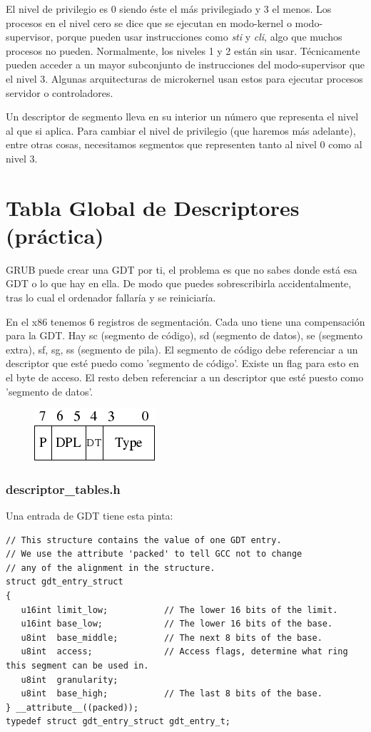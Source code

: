 \documentclass{report}
\begin{document}
El nivel de privilegio es 0 siendo éste el más privilegiado y 3 el menos. Los procesos en el nivel cero se dice que se ejecutan en modo-kernel o modo-supervisor, porque pueden usar instrucciones como \textit{sti} y \textit{cli}, algo que muchos procesos no pueden. Normalmente, los niveles 1 y 2 están sin usar. Técnicamente pueden acceder a un mayor subconjunto de instrucciones del modo-supervisor que el nivel 3. Algunas arquitecturas de microkernel usan estos para ejecutar procesos servidor o controladores.

Un descriptor de segmento lleva en su interior un número que representa el nivel al que si aplica. Para cambiar el nivel de privilegio (que haremos más adelante), entre otras cosas, necesitamos segmentos que representen tanto al nivel 0 como al nivel 3.

\section{Tabla Global de Descriptores (práctica)}

GRUB puede crear una GDT por ti, el problema es que no sabes donde está esa GDT o lo que hay en ella. De modo que puedes sobrescribirla accidentalmente, tras lo cual el ordenador fallaría y se reiniciaría.

En el x86 tenemos 6 registros de segmentación. Cada uno tiene una compensación para la GDT. Hay sc (segmento de código), sd (segmento de datos), se (segmento extra), sf, sg, ss (segmento de pila). El segmento de código debe referenciar a un descriptor que esté puedo como 'segmento de código'. Existe un flag para esto en el byte de acceso. El resto deben referenciar a un descriptor que esté puesto como 'segmento de datos'.

\begin{figure}[htb]
\centering
\includegraphics[scale=0.5]{gdt_idt_gdt_format_2.png}
\end{figure}

\subsubsection{descriptor\_tables.h}

Una entrada de GDT tiene esta pinta:

\begin{lstlisting}
// This structure contains the value of one GDT entry.
// We use the attribute 'packed' to tell GCC not to change
// any of the alignment in the structure.
struct gdt_entry_struct
{
   u16int limit_low;           // The lower 16 bits of the limit.
   u16int base_low;            // The lower 16 bits of the base.
   u8int  base_middle;         // The next 8 bits of the base.
   u8int  access;              // Access flags, determine what ring this segment can be used in.
   u8int  granularity;
   u8int  base_high;           // The last 8 bits of the base.
} __attribute__((packed));
typedef struct gdt_entry_struct gdt_entry_t;
\end{lstlisting}
\end{document}

